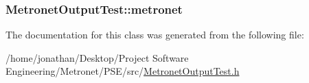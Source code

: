 \subsubsection[{\texorpdfstring{metronet}{metronet}}]{ Metronet\+Output\+Test\+::metronet\hspace{0.3cm}{\ttfamily [protected]}}\hypertarget{class_metronet_output_test_aaa6f34ee762d128cd8aea8c895bb46e4}{}\label{class_metronet_output_test_aaa6f34ee762d128cd8aea8c895bb46e4}


The documentation for this class was generated from the following file\+:\begin{DoxyCompactItemize}
\item 
/home/jonathan/\+Desktop/\+Project Software Engineering/\+Metronet/\+P\+S\+E/src/\hyperlink{_metronet_output_test_8h}{Metronet\+Output\+Test.\+h}\end{DoxyCompactItemize}
